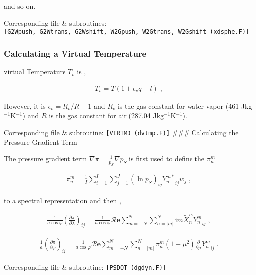 and so on.

Corresponding file \& subroutines: \texttt{{[}G2Wpush,\ G2Wtrans,\ G2Wshift,\ W2Gpush,\ W2Gtrans,\ W2Gshift\ (xdsphe.F){]}}

\hypertarget{calculating-a-virtual-temperature}{%
\subsubsection{Calculating a Virtual Temperature}\label{calculating-a-virtual-temperature}}

virtual Temperature \(T_v\) is ,

\begin{eqnarray}
  T_v = T ( 1 + \epsilon_v q - l ) \; ,
\end{eqnarray}

However, it is \(\epsilon_v = R_v/R - 1\) and \(R_v\) is the gas constant for water vapor (461 Jkg\(^{-1}\)K\(^{-1}\)) and \(R\) is the gas constant for air (287.04 Jkg\(^{-1}\)K\(^{-1}\)).

Corresponding file \& subroutine: \texttt{{[}VIRTMD\ (dvtmp.F){]}} \#\#\# Calculating the Pressure Gradient Term

The pressure gradient term \(\nabla \pi = \frac{1}{p_S} \nabla p_S\) is first used to define the \(\pi_n^m\)

\begin{eqnarray}
  \pi_n^m  =  \frac{1}{I} \sum_{i=1}^{I} \sum_{j=1}^{J}  
               (\ln {p_S})_{ij} {Y_n^{m *}}_{ij}  w_j \; ,
\end{eqnarray}

to a spectral representation and then ,

\begin{eqnarray}
   \frac{1}{a \cos \varphi}
   \left( \frac{\partial \pi}{\partial \lambda} \right)_{ij}
     =
   \frac{1}{a \cos \varphi}
        {\mathcal R}{\mathbf{e}} \sum_{m=-N}^{N} \sum_{n=|m|}^{N}
       \mathrm{i}m \tilde{X}_n^m {Y_n^m}_{ij}  \; ,
\end{eqnarray}

\begin{eqnarray}
   \frac{1}{a}
   \left( \frac{\partial \pi}{\partial \varphi} \right)_{ij}
     =  
   \frac{1}{a \cos \varphi}
       {\mathcal R}{\mathbf{e}} \sum_{m=-N}^{N} \sum_{n=|m|}^{N}
       \pi_n^m
       ( 1-\mu^{2} ) \frac{\partial }{\partial \mu} {Y_n^m}_{ij}  \; .
\end{eqnarray}

Corresponding file \& subroutine: \texttt{{[}PSDOT\ (dgdyn.F){]}}

